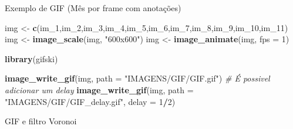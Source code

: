 \documentclass[
  ignorenonframetext,
]{beamer}
\newenvironment{Shaded}{\begin{snugshade}}{\end{snugshade}}
\newcommand{\CommentTok}[1]{\textcolor[rgb]{0.56,0.35,0.01}{\textit{#1}}}
\newcommand{\DataTypeTok}[1]{\textcolor[rgb]{0.13,0.29,0.53}{#1}}
\newcommand{\DecValTok}[1]{\textcolor[rgb]{0.00,0.00,0.81}{#1}}
\newcommand{\KeywordTok}[1]{\textcolor[rgb]{0.13,0.29,0.53}{\textbf{#1}}}
\newcommand{\NormalTok}[1]{#1}
\newcommand{\OperatorTok}[1]{\textcolor[rgb]{0.81,0.36,0.00}{\textbf{#1}}}
\newcommand{\StringTok}[1]{\textcolor[rgb]{0.31,0.60,0.02}{#1}}
\begin{document}
\begin{frame}[fragile]{Exemplo de GIF (Mês por frame com anotações)}
\protect\hypertarget{exemplo-de-gif-muxeas-por-frame-com-anotauxe7uxf5es-1}{}

\begin{Shaded}
\begin{Highlighting}[]
\NormalTok{img <-}\StringTok{ }\KeywordTok{c}\NormalTok{(im_}\DecValTok{1}\NormalTok{,im_}\DecValTok{2}\NormalTok{,im_}\DecValTok{3}\NormalTok{,im_}\DecValTok{4}\NormalTok{,im_}\DecValTok{5}\NormalTok{,im_}\DecValTok{6}\NormalTok{,im_}\DecValTok{7}\NormalTok{,im_}\DecValTok{8}\NormalTok{,im_}\DecValTok{9}\NormalTok{,im_}\DecValTok{10}\NormalTok{,im_}\DecValTok{11}\NormalTok{)}
\NormalTok{img <-}\StringTok{ }\KeywordTok{image_scale}\NormalTok{(img, }\StringTok{"600x600"}\NormalTok{)}
\NormalTok{img <-}\StringTok{ }\KeywordTok{image_animate}\NormalTok{(img, }\DataTypeTok{fps =} \DecValTok{1}\NormalTok{)}
\end{Highlighting}
\end{Shaded}

\begin{Shaded}
\begin{Highlighting}[]
\KeywordTok{library}\NormalTok{(gifski)}

\KeywordTok{image_write_gif}\NormalTok{(img, }\DataTypeTok{path =} \StringTok{"IMAGENS/GIF/GIF.gif"}\NormalTok{)}
 \CommentTok{# É possivel adicionar um delay}
\KeywordTok{image_write_gif}\NormalTok{(img, }\DataTypeTok{path =} \StringTok{"IMAGENS/GIF/GIF_delay.gif"}\NormalTok{,}
                \DataTypeTok{delay =} \DecValTok{1}\OperatorTok{/}\DecValTok{2}\NormalTok{)}
\end{Highlighting}
\end{Shaded}

\end{frame}

\begin{frame}[fragile]{GIF e filtro Voronoi}
\protect\hypertarget{gif-e-filtro-voronoi}{}

\small

\begin{Shaded}
\end{Shaded}

\end{frame}
\end{document}

